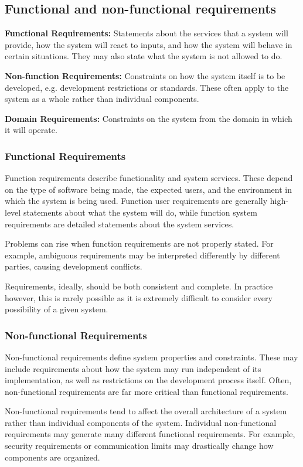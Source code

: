 \documentclass[12pt]{article}
\begin{document}
\subsection*{Functional and non-functional requirements}
    \textbf{Functional Requirements:} Statements about the services that a system will provide, how the system will react to inputs, and how the system will behave in certain situations. They may also state what the system is not allowed to do.

    \textbf{Non-function Requirements:} Constraints on how the system itself is to be developed, e.g. development restrictions or standards. These often apply to the system as a whole rather than individual components.

    \textbf{Domain Requirements:} Constraints on the system from the domain in which it will operate.

\subsubsection*{Functional Requirements}
Function requirements describe functionality and system services. These depend on the type of software being made, the expected users, and the environment in which the system is being used. Function user requirements are generally high-level statements about what the system will do, while function system requirements are detailed statements about the system services.

Problems can rise when function requirements are not properly stated. For example, ambiguous requirements may be interpreted differently by different parties, causing development conflicts.

Requirements, ideally, should be both consistent and complete. In practice however, this is rarely possible as it is extremely difficult to consider every possibility of a given system.

\subsubsection*{Non-functional Requirements}

Non-functional requirements define system properties and constraints. These may include requirements about how the system may run independent of its implementation, as well as restrictions on the development process itself. Often, non-functional requirements are far more critical than functional requirements.

Non-functional requirements tend to affect the overall architecture of a system rather than individual components of the system. Individual non-functional requirements may generate many different functional requirements. For example, security requirements or communication limits may drastically change how components are organized.
\end{document}
